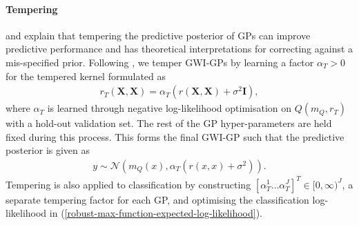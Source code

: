 \documentclass{article}
\numberwithin{equation}{section}
\begin{document}
\paragraph{Tempering}\cite{wild2022generalized} and \cite{adlam2020cold} explain that tempering the predictive posterior of GPs can improve predictive performance and has theoretical interpretations for correcting against a mis-specified prior. Following \cite{wild2022generalized}, we temper GWI-GPs by learning a factor $\alpha_T > 0$ for the tempered kernel formulated as
\begin{align}
    r_T(\mathbf{X}, \mathbf{X}) = \alpha_T \left(r(\mathbf{X}, \mathbf{X})+\sigma^2 \mathbf{I}\right),
\end{align}
where $\alpha_T$ is learned through negative log-likelihood optimisation on $Q\left(m_Q, r_T\right)$ with a hold-out validation set. 
The rest of the GP hyper-parameters are held fixed during this process. 
This forms the final GWI-GP such that the predictive posterior is given as
\begin{align}
    y \sim \mathcal{N}\left(m_Q(x), \alpha_T \left( r(x, x) + \sigma^2\right) \right).
\end{align}
Tempering is also applied to classification by constructing $\left[\alpha_T^1 \dots \alpha_T^J\right]^T \in [0, \infty)^J$, a separate tempering factor for each GP, and optimising the classification log-likelihood in (\ref{robust-max-function-expected-log-likelihood}).
\end{document}
